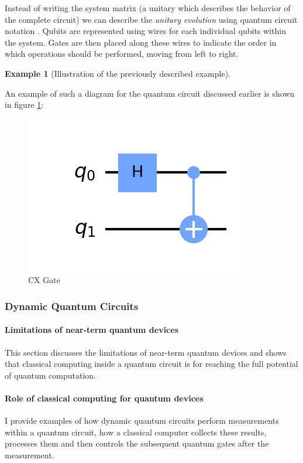 \documentclass[11pt]{article}
\theoremstyle{definition}
\newtheorem{exmp}{Example}[section]
\theoremstyle{definition}
\begin{document}
Instead of writing the system matrix (a unitary which describes the behavior
of the complete circuit) we can describe the \emph{unitary evolution} using
quantum circuit notation \cite{nielsen_quantum_2010}.
Qubits are represented using wires for each individual qubits within the
system. 
Gates are then placed along these wires to indicate the order
in which operations should be performed, moving from left to right.
\begin{exmp}[Illustration of the previously described example]
\end{exmp}
An example of such a
diagram for the quantum circuit discussed earlier is shown in figure \ref{fig:orga04c113}:
\begin{figure}[htbp]
\centering
\includegraphics[scale=0.8]{./img/cx_gate.png}
\caption{\label{fig:orga04c113}CX Gate}
\end{figure}


\subsubsection{Dynamic Quantum Circuits}
\label{sec:org8b0e923}
\paragraph{Limitations of near-term quantum devices}
\label{sec:org9a4e2be}
This section discusses the limitations of near-term quantum
devices and shows that classical computing inside a quantum circuit is
for reaching the full potential of quantum computation.

\paragraph{Role of classical computing for quantum devices}
\label{sec:org31e2285}
I provide examples of how dynamic quantum circuits perform measurements
within a quantum circuit, how a classical computer collects these results,
processes them and then controls the subsequent quantum gates after the measurement.
\end{document}
